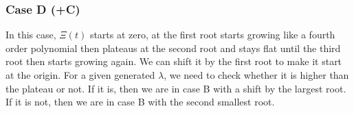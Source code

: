 \subsubsection*{Case D (+C)}
In this case, $\Xi(t)$ starts at zero, at the first root starts growing like a fourth order polynomial then plateaus at the second root and stays flat until the third root then starts growing again. We can shift it by the first root to make it start at the origin. For a given generated $\lambda$, we need to check whether it is higher than the plateau or not. If it is, then we are in case B with a shift by the largest root. If it is not, then we are in case B with the second smallest root.

